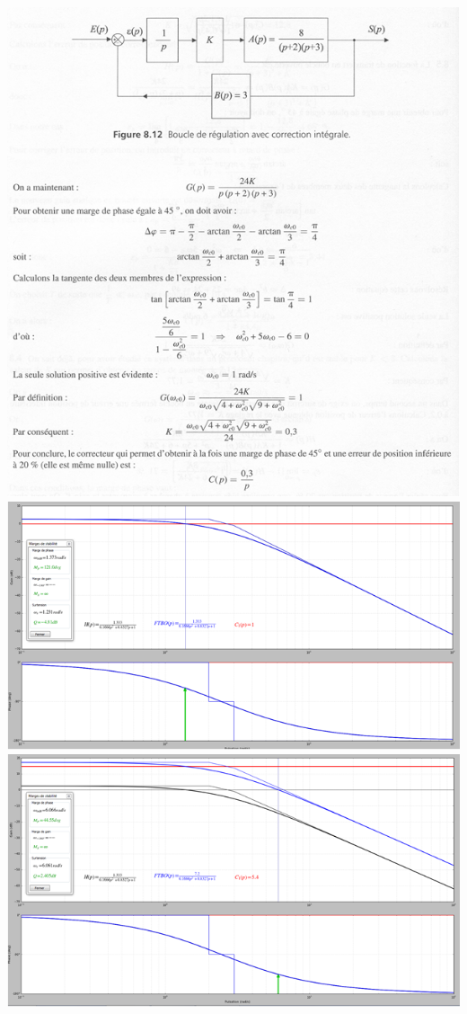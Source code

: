 \documentclass[10pt,fleqn]{article} %
\begin{document}
\begin{center}
		\includegraphics[width=.8\linewidth]{images/cor_02}
			\includegraphics[width=.8\linewidth]{images/cor_03}
				\includegraphics[width=.8\linewidth]{images/cor_04}
\end{center}
\end{document}
